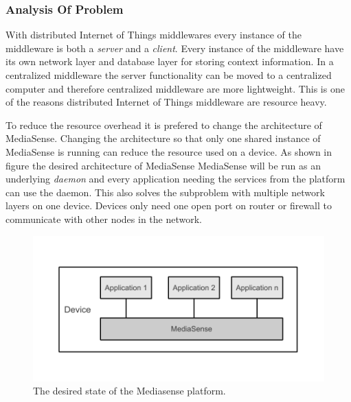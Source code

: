 \subsubsection{Analysis Of Problem}
With distributed Internet of Things middlewares every instance of the middleware is both a \emph{server} and a \emph{client}. Every instance of the middleware have its own network layer and database layer for storing context information. In a centralized middleware the server functionality can be moved to a centralized computer and therefore centralized middleware are more lightweight. This is one of the reasons distributed Internet of Things middleware are resource heavy. 

To reduce the resource overhead it is prefered to change the architecture of MediaSense. Changing the architecture so that only one shared instance of MediaSense is running can reduce the resource used on a device.  As shown in figure the desired architecture of MediaSense MediaSense will be run as an underlying  \emph{daemon} and every application needing the services from the platform can use the daemon. This also solves the subproblem with multiple network layers on one device. Devices only need one open port on router or firewall to communicate with other nodes in the network.  

\begin{figure}[h!]
	\centering
    	\includegraphics[scale=0.75]{part_4/result_and_analysis/mediasense_arch_new.pdf}
    	\centering
		\caption{The desired state of the Mediasense platform.} 
\end{figure}
